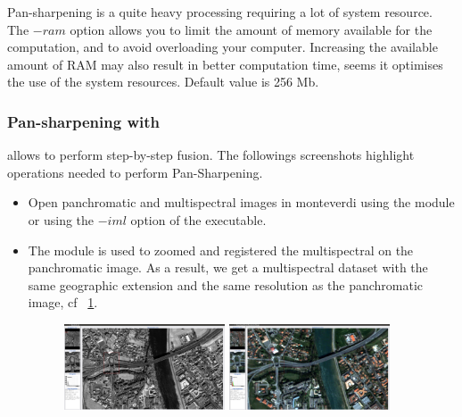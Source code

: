 Pan-sharpening is a quite heavy processing requiring a lot of system
resource. The $-ram$ option allows you to limit the amount of memory
available for the computation, and to avoid overloading your
computer. Increasing the available amount of RAM may also result in
better computation time, seems it optimises the use of the system
resources. Default value is 256 Mb.


\subsubsection{Pan-sharpening with \mont}

\mont allows to perform step-by-step fusion. The followings screenshots highlight operations needed to perform Pan-Sharpening.

\begin{itemize}
\item Open panchromatic and multispectral images in monteverdi using the  module or using the  $-iml$ option of the \mont executable.

\item The  module is used to zoomed and registered
  the multispectral on the panchromatic image. As a result, we get a
  multispectral dataset with the same geographic extension and the
  same resolution as the panchromatic image, cf ~\ref{fig:qbmulsuper}.

\begin{figure}
  \center
  \includegraphics[width=0.45\textwidth]{../Art/MonteverdiImages/monteverdi_QB_PAN_ROI.png}
  \includegraphics[width=0.45\textwidth]{../Art/MonteverdiImages/monteverdi_QB_MUL_Superimpose.png}
  \label{fig:qbmulsuper}
\end{figure}


\end{itemize}
